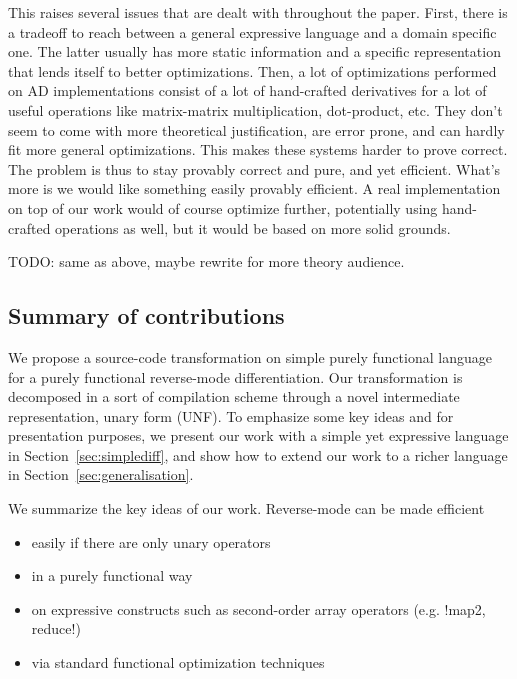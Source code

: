 This raises several issues that are dealt with throughout the paper. First, there is a tradeoff to reach between a general expressive language and a domain specific one. The latter usually has more static information and a specific representation that lends itself to better optimizations.
Then, a lot of optimizations performed on AD implementations consist of a lot of hand-crafted derivatives for a lot of useful operations like matrix-matrix multiplication, dot-product, etc.
They don't seem to come with more theoretical justification, are error prone, and can hardly fit more general optimizations.
This makes these systems harder to prove correct. The problem is thus to stay provably correct and pure, and yet efficient. What's more is we would like something easily provably efficient. 
A real implementation on top of our work would of course optimize further, potentially using hand-crafted operations as well, but it would be based on more solid grounds.

TODO: same as above, maybe rewrite for more theory audience.

\subsection{Summary of contributions}

We propose a source-code transformation on simple purely functional language for a purely functional reverse-mode differentiation.
Our transformation is decomposed in a sort of compilation scheme through a novel intermediate representation, unary form (UNF).
To emphasize some key ideas and for presentation purposes, we present our work with a simple yet expressive language in Section~\ref{sec:simplediff}, 
and show how to extend our work to a richer language in Section~\ref{sec:generalisation}. 

We summarize the key ideas of our work. Reverse-mode can be made efficient
\begin{itemize}
   \item easily if there are only unary operators
   \item in a purely functional way
   \item on expressive constructs such as second-order array operators (e.g. !map2, reduce!) 
   \item via standard functional optimization techniques
\end{itemize}

